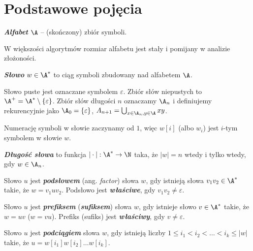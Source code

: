 \section{Podstawowe pojęcia}

\begin{definition}{}{}
  \textbf{\textit{Alfabet}} $\A$ -- (skończony) zbiór symboli.
\end{definition}

W większości algorytmów rozmiar alfabetu jest stały i pomijany w analizie złożoności.

\begin{definition}{}{}
  \textbf{\textit{Słowo}} $w \in \A^*$ to ciąg symboli zbudowany nad alfabetem $\A$.
\end{definition}

Słowo puste jest oznaczane symbolem $\varepsilon$. Zbiór słów niepustych to $\A^+ = \A^* \setminus \{\varepsilon\}$.
Zbiór słów długości $n$ oznaczamy $\A_n$ i definiujemy rekurencyjnie jako $\A_0 = \{\varepsilon\}$, $A_{n + 1} = \bigcup_{x \in \A_n, y \in \A} xy$. 

Numerację symboli w słowie zaczynamy od $1$, więc $w[i]$ (albo $w_i$) jest $i$-tym symbolem w słowie $w$.

\begin{definition}{}{}
  \textbf{\textit{Długość słowa}} to funkcja $|\cdot|: \A^* \to \N$  taka, że $|w| = n$ wtedy i tylko wtedy, gdy $w \in \A_n$.
\end{definition}

\begin{definition}{}{}
  Słowo $u$ jest \textbf{\textit{podsłowem}} (ang. \emph{factor}) słowa $w$, gdy istnieją słowa $v_1 v_2 \in \A^*$ takie, że $w = v_1 u v_2$.
  Podsłowo jest \textbf{\textit{właściwe}}, gdy $v_1 v_2 \neq \varepsilon$.
\end{definition}


\begin{definition}{}{}
  Słowo $u$ jest \textbf{\textit{prefiksem}} (\textbf{\textit{sufiksem}}) słowa $w$, gdy istnieje słowo $v \in \A^*$ takie, że $w = u v$ ($w = v u$).
  Prefiks (sufiks) jest \textbf{\textit{właściwy}}, gdy $v \neq \varepsilon$.
\end{definition}

\begin{definition}{}{}
  Słowo $u$ jest \textbf{\textit{podciągiem}} słowa $w$, gdy istnieją liczby $1 \le i_1 < i_2 < \ldots < i_k \le |w|$ takie, że $u = w[i_1] w[i_2] \ldots w[i_k]$.
\end{definition}

